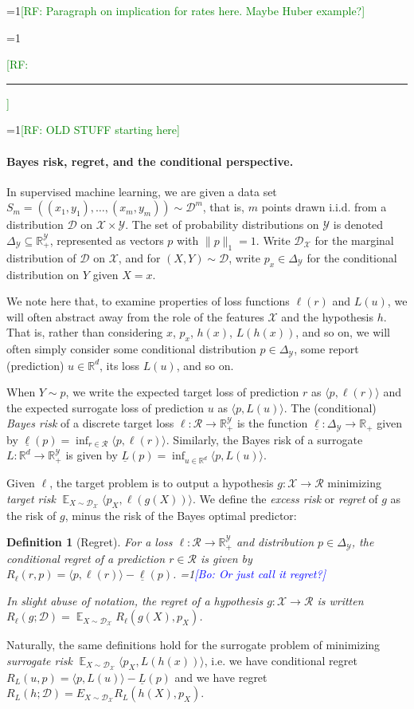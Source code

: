 \documentclass{article}
\newtheorem{definition}{Definition}
\newcommand{\Comments}{1}
\newcommand{\mynote}[2]{\ifnum\Comments=1\textcolor{#1}{#2}\fi}
\newcommand{\raf}[1]{\mynote{green}{[RF: #1]}}
\newcommand{\bo}[1]{\mynote{blue}{[Bo: #1]}}
\newcommand{\reals}{\mathbb{R}}
\newcommand{\simplex}{\Delta_\Y}
\newcommand{\D}{\mathcal{D}}
\DeclareMathOperator{\E}{\mathbb{E}}  %
\newcommand{\R}{\mathcal{R}}
\newcommand{\X}{\mathcal{X}}
\newcommand{\Y}{\mathcal{Y}}
\newcommand{\risk}[1]{\underline{#1}}
\newcommand{\inprod}[2]{\langle #1, #2 \rangle}%
\begin{document}
\raf{Paragraph on implication for rates here.  Maybe Huber example?}


\raf{\hrule}
\raf{OLD STUFF starting here}

\paragraph{Bayes risk, regret, and the conditional perspective.}
In supervised machine learning, we are given a data set $S_m = ((x_1,y_1), \dots, (x_m,y_m)) \sim \D^m$, that is, $m$ points drawn i.i.d. from a distribution $\D$ on $\X \times \Y$.
The set of probability distributions on $\Y$ is denoted $\simplex\subseteq\reals^{\Y}_+$, represented as vectors $p$ with $\|p\|_1 = 1$.
Write $\D_{\X}$ for the marginal distribution of $\D$ on $\X$, and for $(X,Y) \sim \D$, write $p_x \in \simplex$ for the conditional distribution on $Y$ given $X=x$.

We note here that, to examine properties of loss functions $\ell(r)$ and $L(u)$, we will often abstract away from the role of the features $\X$ and the hypothesis $h$.
That is, rather than considering $x$, $p_x$, $h(x)$, $L(h(x))$, and so on, we will often simply consider some conditional distribution $p \in \simplex$, some report (prediction) $u \in \reals^d$, its loss $L(u)$, and so on.

When $Y \sim p$, we write the expected target loss of prediction $r$ as $\inprod{p}{\ell(r)}$ and the expected surrogate loss of prediction $u$ as $\inprod{p}{L(u)}$.
The (conditional) \emph{Bayes risk} of a discrete target loss $\ell: \R \to \reals^{\Y}_+$ is the function $\risk{\ell}: \simplex \to \reals_+$ given by $\risk{\ell}(p) = \inf_{r \in \R} \inprod{p}{\ell(r)}$.
Similarly, the Bayes risk of a surrogate $L: \reals^d \to \reals^{\Y}_+$ is given by $\risk{L}(p) = \inf_{u\in\reals^d} \inprod{p}{L(u)}$.

Given $\ell$, the target problem is to output a hypothesis $g: \X \to \R$ minimizing \emph{target risk} $\E_{X \sim \D_\X} \inprod{p_X}{\ell(g(X))}$.
We define the \emph{excess risk} or \emph{regret} of $g$ as the risk of $g$, minus the risk of the Bayes optimal predictor:
\begin{definition}[Regret] \label{def:full-regret}
  For a loss $\ell: \R \to \reals^{\Y}_+$ and distribution $p \in \simplex$, the \emph{conditional regret} of a prediction $r \in \R$ is given by $R_{\ell}(r,p) = \inprod{p}{\ell(r)} - \risk{\ell}(p)$. \bo{Or just call it regret?}

  In slight abuse of notation, the \emph{regret} of a hypothesis $g: \X \to \R$ is written $R_{\ell}(g; \D) = \E_{X \sim \D_{\X}} R_{\ell}(g(X), p_X)$.
\end{definition}
Naturally, the same definitions hold for the surrogate problem of minimizing \emph{surrogate risk} $\E_{X \sim \D_\X} \inprod{p_X}{L(h(x))}$, i.e. we have conditional regret $R_L(u,p) = \inprod{p}{L(u)} - \risk{L}(p)$ and we have regret $R_L(h;\D) = E_{X \sim \D_{\X}} R_L(h(X), p_X)$.
\end{document}
